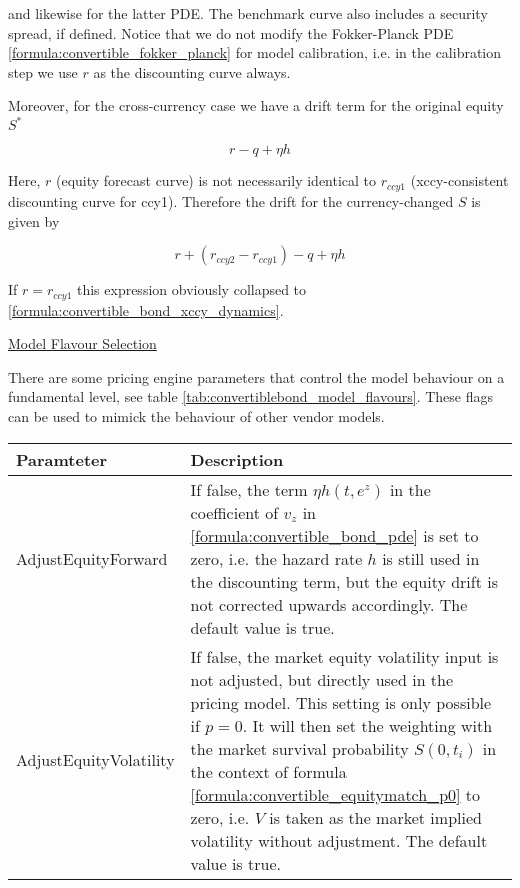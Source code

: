 {and likewise for the latter PDE. The benchmark curve also includes a security spread, if defined. Notice that we do not
modify the Fokker-Planck PDE \ref{formula:convertible_fokker_planck} for model calibration, i.e. in the calibration step
we use $r$ as the discounting curve always.

Moreover, for the cross-currency case we have a drift term for the original equity $S^*$

\begin{equation}
  r - q + \eta h
\end{equation}

Here, $r$ (equity forecast curve) is not necessarily identical to $r_{ccy1}$ (xccy-consistent discounting curve for
ccy1). Therefore the drift for the currency-changed $S$ is given by

\begin{equation}
  r + ( r_{ccy2} - r_{ccy1}) - q + \eta h
\end{equation}

If $r=r_{ccy1}$ this expression obviously collapsed to \ref{formula:convertible_bond_xccy_dynamics}.

\underline{Model Flavour Selection}

There are some pricing engine parameters that control the model behaviour on a fundamental level, see table
\ref{tab:convertiblebond_model_flavours}. These flags can be used to mimick the behaviour of other vendor models.

\begin{table}[h]
  \begin{tabular}{p{5cm}|p{11cm}}
    Paramteter & Description \\
    \hline
    AdjustEquityForward & If false, the term $\eta h(t,e^z)$ in the coefficient of
    $v_z$ in \ref{formula:convertible_bond_pde} is set to zero, i.e. the hazard rate $h$ is still used in the
    discounting term, but the equity drift is not corrected upwards accordingly. The default value is true. \\ \hline

    AdjustEquityVolatility & If false, the market equity volatility input is not adjusted, but directly used in the
    pricing model. This setting is only possible if $p=0$. It will then set the weighting with the market survival
    probability $S(0,t_i)$ in the context of formula \ref{formula:convertible_equitymatch_p0} to zero, i.e. $V$ is taken
    as the market implied volatility without adjustment. The default value is true. \\ \hline


\end{tabular}
\end{table}}
